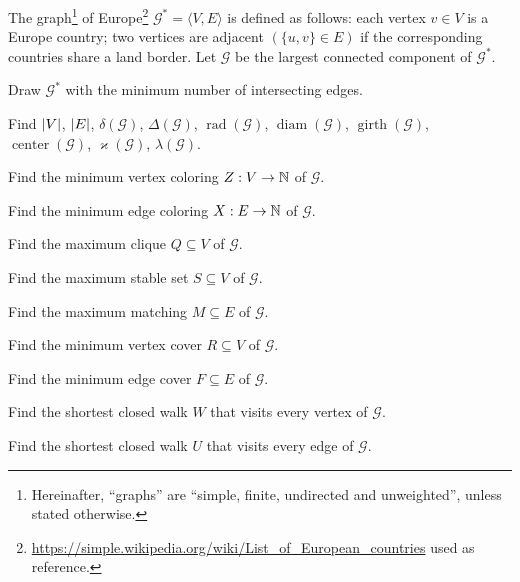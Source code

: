 \documentclass[a4paper,12pt]{article}
\newcommand{\graph}[1][G]{\mathcal{#1}}
\newcommand{\op}[1]{\operatorname*{#1}}
\newcommand{\minDegree}[1]{\delta(#1)}
\newcommand{\maxDegree}[1]{\Delta(#1)}
\newcommand{\graphRadius}[1]{\op{rad}(#1)}
\newcommand{\graphDiameter}[1]{\op{diam}(#1)}
\newcommand{\graphGirth}[1]{\op{girth}(#1)}
\newcommand{\graphCenter}[1]{\op{center}(#1)}
\newcommand{\vertexConnectivity}[1]{\varkappa(#1)}
\newcommand{\edgeConnectivity}[1]{\lambda(#1)}
\begin{document}
\begin{tasks}
    \item The graph\footnote{Hereinafter, \enquote{graphs} are \enquote{simple, finite, undirected and unweighted}, unless stated otherwise.} of Europe\footnote{\url{https://simple.wikipedia.org/wiki/List_of_European_countries} used as reference.} $\graph^{*} = \langle V, E\rangle$ is defined as follows: each vertex $v \in V$ is a Europe country; two vertices are adjacent $(\{u, v\} \in E)$ if the corresponding countries share a land border. Let $\graph$ be the largest connected component of $\graph^{*}$.
    
    \begin{subtasks}
        \item Draw $\graph^{*}$ with the minimum number of intersecting edges.
        
        \item Find $\left|V\right|$, $\left|E\right|$, $\minDegree{\graph}$, $\maxDegree{\graph}$, $\graphRadius{\graph}$, $\graphDiameter{\graph}$, $\graphGirth{\graph}$, $\graphCenter{\graph}$, $\vertexConnectivity{\graph}$, $\edgeConnectivity{\graph}$.

        \item Find the minimum vertex coloring $Z: V \to \mathbb{N}$ of $\graph$.
        
        \item Find the minimum edge coloring $X: E \to \mathbb{N}$ of $\graph$.
        
        \item Find the maximum clique $Q \subseteq V$ of $\graph$.

        \item Find the maximum stable set $S \subseteq V$ of $\graph$.
        
        \item Find the maximum matching $M \subseteq E$ of $\graph$.
        
        \item Find the minimum vertex cover $R \subseteq V$ of $\graph$.
        
        \item Find the minimum edge cover $F \subseteq E$ of $\graph$.
        
        \item Find the shortest closed walk $W$ that visits every vertex of $\graph$.
        
        \item Find the shortest closed walk $U$ that visits every edge of $\graph$.
        

\end{subtasks}
\end{tasks}
\end{document}
